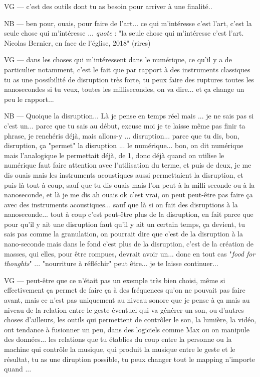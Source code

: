 VG — c'est des outils dont tu as besoin pour arriver à une finalité..

NB — ben pour, ouais, pour faire de l'art... ce qui m'intéresse c'est l'art, c'est la seule chose qui m'intéresse ... \textit{quote} : "la seule chose qui m'intéresse c'est l'art. Nicolas Bernier, en face de l'église, 2018" (rires) 

VG —  dans les choses qui m'intéressent dans le numérique, ce qu'il y a de particulier notamment, c'est le fait que par rapport à des instruments classiques tu as une possibilité de disruption très forte, tu peux faire des ruptures toutes les nanosecondes si tu veux, toutes les millisecondes, on va dire... et ça change un peu le rapport... 

NB — Quoique la disruption... Là je pense en temps réel mais ... je ne sais pas si c'est un...  parce que tu sais au début, excuse moi je te laisse même pas finir ta phrase, je renchéris déjà, mais allons-y ... disruption...  parce que tu dis, bon, disruption, ça "permet" la disruption ... le numérique... bon, on dit numérique mais l'analogique le permettait déjà, de 1, donc déjà quand on utilise le numérique faut faire attention avec l'utilisation du terme, et puis de deux, je me dis ouais mais les instruments acoustiques aussi permettaient la disruption, et puis là tout à coup, sauf que tu dis ouais mais l'on peut à la milli-seconde ou à la nanoseconde, et là je me dis ah ouais ok c'est vrai, on peut peut-être pas faire ça avec des instruments acoustiques...  sauf que là si on fait des disruptions à la nanoseconde... tout à coup c'est peut-être plus de la disruption, en fait parce que pour qu'il y ait une disruption faut qu'il y ait un certain temps, ça devient, tu sais pas comme la granulation, on pourrait dire que c'est de la disruption à la nano-seconde mais dans le fond c'est plus de la disruption, c'est de la création de masses, qui elles, pour être rompues, devrait avoir un... donc en tout cas "\textit{food for thoughts}" ... "nourriture à réfléchir" peut être... je te laisse continuer... 

VG —  peut-être que ce n'était pas un exemple très bien choisi, même si effectivement ça permet de faire ça à des fréquences qu'on ne pouvait pas faire avant, mais ce n'est pas uniquement au niveau sonore que je pense à ça mais au niveau de la relation entre le geste éventuel qui va générer un son, ou d'autres choses d'ailleurs, les outils qui permettent de contrôler le son, la lumière, la vidéo, ont tendance à fusionner un peu, dans des logiciels comme Max ou on manipule des données... les relations que tu établies du coup entre la personne ou la machine qui contrôle la musique, qui produit la musique entre le geste et le résultat, tu as une diruption possible, tu peux changer tout le mapping n'importe quand ...

